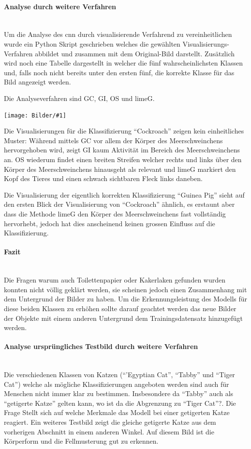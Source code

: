 \documentclass[
  12pt, %
  a4paper, %
  oneside, %
  openany, 
  numbers=noenddot, %
  BCOR=5mm, %
  parskip=half*, %
  thesis, %
]{bfhbook}
\newcommand{\parag}[1]{\paragraph*{#1}\mbox{}\\}
\newcommand{\imgText}[3]{
\begin{center}
    \begin{minipage}[t]{0.6\textwidth}
    		\vspace{0pt}
		\texttt{[image: Bilder/\#1]}
		\captionof{figure}{#2}
	\end{minipage}\hfill
    \begin{minipage}[t]{0.4\textwidth}
    		\vspace{5pt}
  		#3
    \end{minipage}
\end{center}
}
\begin{document}
\parag{Analyse durch weitere Verfahren}
Um die Analyse des \Gls{cnn} durch visualisierende Verfahrend zu vereinheitlichen wurde ein Python Skript geschrieben \cite{imgClassCombined} welches die gewählten Visualisierungs-Verfahren abbildet und zusammen mit dem Original-Bild darstellt. Zusätzlich wird noch eine Tabelle dargestellt in welcher die fünf wahrscheinlichsten Klassen und, falls noch nicht bereits unter den ersten fünf, die korrekte Klasse für das Bild angezeigt werden.

 Die Analyseverfahren sind \Gls{GC}, \Gls{GI}, \Gls{OS} und \Gls{limeG}.
\imgText{Oreo-Classification.png}{Testbild Meerschweinchen div. Verfahren}{
Die Visualisierungen für die Klassifizierung ``Cockroach''  zeigen kein einheitliches Muster: \break 
Während mittels \Gls{GC} vor allem der Körper des Meerschweinchens hervorgehoben wird, zeigt \Gls{GI} kaum Aktivität im Bereich des Meerschweinchens an. 
\break\break 
\Gls{OS} wiederum findet einen breiten Streifen welcher rechts und links über den Körper des Meerschweinchens hinausgeht als relevant und \Gls{limeG} markiert den Kopf des Tieres und einen schwach sichtbaren Fleck links daneben. \break
}
Die Visualisierung der eigentlich korrekten Klassifizierung ``Guinea Pig'' sieht auf den ersten Blick der Visualisierung von ``Cockroach'' ähnlich, es erstaunt aber dass die Methode \Gls{limeG} den Körper des Meerschweinchens fast vollständig hervorhebt, jedoch hat dies anscheinend keinen grossen Einfluss auf die Klassifizierung.

\parag{Fazit}
Die Fragen warum auch Toilettenpapier oder Kakerlaken gefunden wurden konnten nicht völlig geklärt werden, sie scheinen jedoch einen Zusammenhang mit dem Untergrund der Bilder zu haben. Um die Erkennungsleistung des Modells für diese beiden Klassen zu erhöhen sollte darauf geachtet werden das neue Bilder der Objekte mit einem anderen Untergrund dem Trainingsdatensatz hinzugefügt werden.

\parag{Analyse ursprüngliches Testbild durch weitere Verfahren}
Die verschiedenen Klassen von Katzen  (``'Egyptian Cat'', ``Tabby'' und ``Tiger Cat'') welche als mögliche Klassifizierungen angeboten werden sind auch für Menschen nicht immer klar zu bestimmen. Insbesondere da ``Tabby'' auch als ``getigerte Katze'' gelten kann, wo ist da die Abgrenzung zu ``Tiger Cat''?. Die Frage Stellt sich auf welche Merkmale das Modell bei einer getigerten Katze reagiert. Ein weiteres Testbild zeigt die gleiche getigerte Katze aus dem vorherigen Abschnitt in einem anderen Winkel. Auf diesem Bild ist die Körperform und die Fellmusterung gut zu erkennen.
\end{document}
